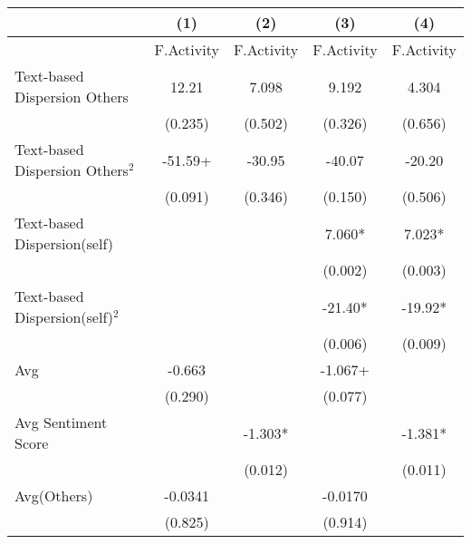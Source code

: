 \begin{table}[]
\centering
\begin{tabular}{@{}lcccc@{}}
\toprule
                                                       & (1)                 & (2)        & (3)        & (4)        \\ \midrule
                                                       & F.Activity          & F.Activity & F.Activity & F.Activity \\
Text-based Dispersion Others                              & 12.21               & 7.098      & 9.192      & 4.304      \\
                                                       & (0.235)             & (0.502)    & (0.326)    & (0.656)    \\
Text-based Dispersion Others$^2$ & -51.59+             & -30.95     & -40.07     & -20.20     \\
                                                       & (0.091)             & (0.346)    & (0.150)    & (0.506)    \\
Text-based Dispersion(self)                               &                     &            & 7.060*     & 7.023*     \\
                                                       &                     &            & (0.002)    & (0.003)    \\
Text-based Dispersion(self)$^2$  &                     &            & -21.40*    & -19.92*    \\
                                                       &                     &            & (0.006)    & (0.009)    \\
Avg                                                    & -0.663              &            & -1.067+    &            \\
                                                       & (0.290)             &            & (0.077)    &            \\
Avg Sentiment Score                                    &                     & -1.303*    &            & -1.381*    \\
                                                       &                     & (0.012)    &            & (0.011)    \\
Avg(Others)                                            & -0.0341             &            & -0.0170    &            \\
                                                       & (0.825)             &            & (0.914)    &            \\

\end{tabular}
\end{table}
